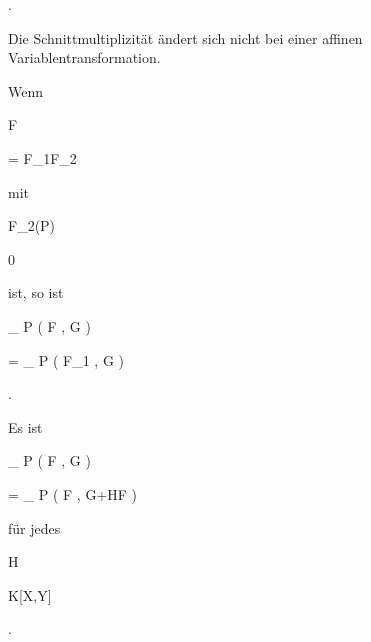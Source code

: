 {{{{{    }{
}

{   }{
}

}
{}{}{.}
}{Die Schnittmultiplizität ändert sich nicht bei einer affinen Variablentransformation.
}{Wenn


\mavergleichskette

{\vergleichskette

{F
}

{ = }{ F_1F_2
}

{  }{
}

{    }{
}

{   }{
}

}
{}{}{}
mit


\mavergleichskette

{\vergleichskette

{ F_2(P)
}

{ \neq }{ 0
}

{  }{
}

{    }{
}

{   }{
}

}
{}{}{}
ist, so ist


\mavergleichskette

{\vergleichskette

{  _{ { P} }  (   F ,  G  )
}

{ = }{  _{ { P} }  (  F_1 ,  G  )
}

{  }{
}

{    }{
}

{   }{
}

}
{}{}{.}
}{Es ist


\mavergleichskette

{\vergleichskette

{  _{ { P} }  (   F ,  G  )
}

{ = }{  _{ {P} }  (   F ,  G+HF )
}

{  }{
}

{    }{
}

{   }{
}

}
{}{}{}
für jedes


\mavergleichskette

{\vergleichskette

{ H
}

{ \in }{ K[X,Y]
}

{  }{
}

{    }{
}

{   }{
}

}
{}{}{.}
}}

\faktzusatz {}

\faktzusatz {}


}



